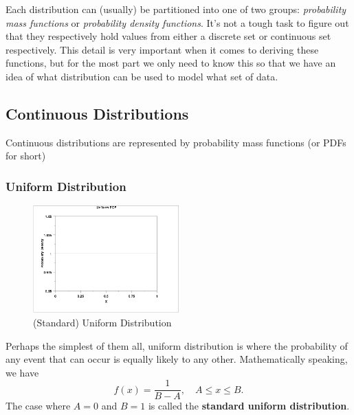 \documentclass{article}
\begin{document}
Each distribution can (usually) be partitioned into one of two groups: \textit{probability mass functions} or \textit{probability density functions}. It's not a tough task to figure out that they respectively hold values from either a discrete set or continuous set respectively. This detail is very important when it comes to deriving these functions, but for the most part we only need to know this so that we have an idea of what distribution can be used to model what set of data. 

\subsection{Continuous Distributions}
Continuous distributions are represented by probability mass functions (or PDFs for short)

\subsubsection{Uniform Distribution}
\begin{figure}[H]
\centering
\includegraphics[width=0.5\textwidth]{images/unipdf.png}
\caption{(Standard) Uniform Distribution}
\end{figure}

Perhaps the simplest of them all, uniform distribution is where the probability of any event that can occur is equally likely to any other. Mathematically speaking, we have
\begin{equation}
    f(x) = \frac{1}{B-A},\quad A\leq x \leq B.
\end{equation}
The case where $A=0$ and $B=1$ is called the \textbf{standard uniform distribution}.
\end{document}
